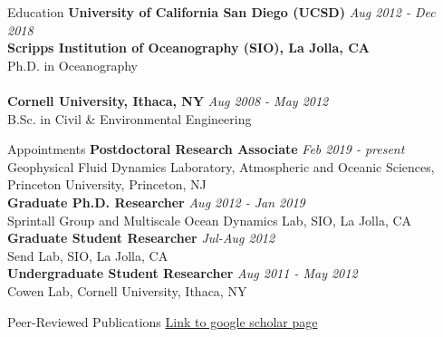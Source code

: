 \documentclass{resume} %
\begin{document}
\begin{rSection}{Education}
{\bf University of California San Diego (UCSD)} \hfill {\em Aug 2012 - Dec 2018}\\
{\bf Scripps Institution of Oceanography (SIO), La Jolla, CA} \\ Ph.D. in Oceanography \\
\\
{\bf Cornell University, Ithaca, NY} \hfill {\em Aug 2008 - May 2012} \\
B.Sc. in Civil \& Environmental Engineering
\end{rSection}

\begin{rSection}{Appointments}
{\bf Postdoctoral Research Associate} \hfill {\em Feb 2019 - present}\\
Geophysical Fluid Dynamics Laboratory, Atmospheric and Oceanic Sciences, Princeton University, Princeton, NJ \\
{\bf Graduate Ph.D. Researcher} \hfill {\em Aug 2012 - Jan 2019}\\
Sprintall Group and Multiscale Ocean Dynamics Lab, SIO, La Jolla, CA \\
{\bf Graduate Student Researcher} \hfill {\em Jul-Aug 2012}\\
Send Lab, SIO, La Jolla, CA \\
{\bf Undergraduate Student Researcher} \hfill {\em Aug 2011 - May 2012}\\
Cowen Lab, Cornell University, Ithaca, NY
\end{rSection}

\begin{rSection}{Peer-Reviewed Publications}
\href{https://scholar.google.com/citations?user=UGkNcW8AAAAJ&hl=en&oi=sra}{Link to google scholar page}
\begingroup
\renewcommand{\section}[2]{}
\endgroup
\end{rSection}
\end{document}
